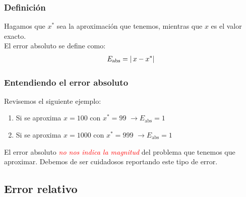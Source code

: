 \documentclass[12pt]{beamer}
\begin{document}
\begin{frame}
\frametitle{Definición}
Hagamos que $x^{*}$ sea la aproximación que tenemos, mientras que $x$ es el valor exacto.
\\
\bigskip
\pause
El error absoluto se define como:
\begin{align*}
E_{\text{abs}} = \abs{ \, x - x^{*}}
\end{align*}
\end{frame}
\begin{frame}
\frametitle{Entendiendo el error absoluto}
Revisemos el siguiente ejemplo:
\begin{enumerate}[<+->]
\item Si se aproxima $x = 100$ con $x^{*} = 99$ \pause $\to E_{\text{abs}} = 1$ \pause
\item Si se aproxima $x = 1000$ con $x^{*} = 999$ \pause $\to E_{\text{abs}} = 1$
\end{enumerate}
\pause
El error absoluto \emph{\textcolor{red}{no nos indica la magnitud}} del problema que tenemos que aproximar. \pause Debemos de ser cuidadosos reportando este tipo de error.
\end{frame}

\subsection{Error relativo}
\end{document}
